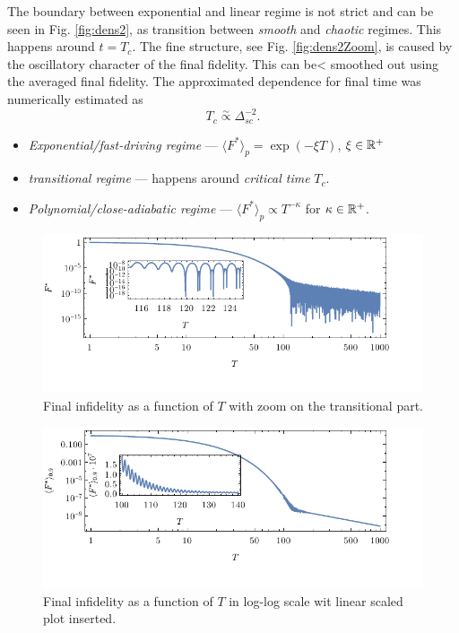 The boundary between exponential and linear regime is not strict and can be seen in Fig. \ref{fig:dens2}, as transition between \emph{smooth} and \emph{chaotic} regimes. This happens around $t=T_c$. The fine structure, see Fig. \ref{fig:dens2Zoom}, is caused by the oscillatory character of the final fidelity. This can be< smoothed out using the averaged final fidelity. The approximated dependence for final time was numerically estimated as
\begin{equation}
    T_c\overset{\sim}{\propto} \Delta_{sc}^{-2}.
\end{equation}


\begin{itemize}
    \item \emph{Exponential/fast-driving regime} — $\langle F^*\rangle_p= \exp(-\xi T)$, $\xi\in\mathbb{R}^+$
    \item \emph{transitional regime} — happens around \emph{critical time} $T_c$.
    \item \emph{Polynomial/close-adiabatic regime} — $\langle F^*\rangle_p\propto T^{-\kappa}$ for $\kappa\in \mathbb{R}^+$.
\end{itemize}

\begin{figure}[h]
    \centering
    \includegraphics[scale=1.2]{../img/infidelityTfPlotLogLinCombined1.pdf}
    \caption{Final infidelity as a function of $T$ with zoom on the transitional part.}
    \label{fig:infidelityTfPlotLogLinCombined}
\end{figure}
\begin{figure}[h]
    \centering
    \includegraphics[scale=1.2]{../img/infidCombined1.pdf}
    \caption{Final infidelity as a function of $T$ in log-log scale wit linear scaled plot inserted.}
    \label{fig:infidCombined}
\end{figure}




